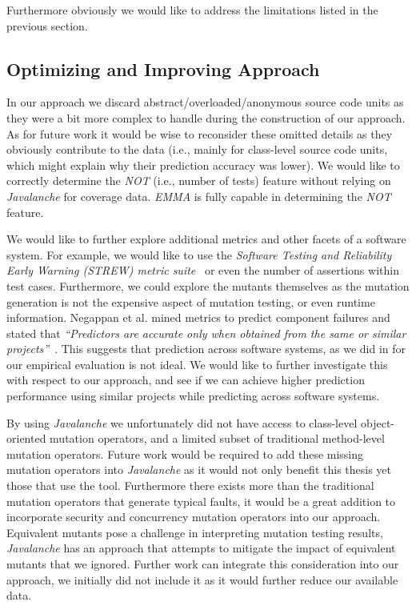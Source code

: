 Furthermore obviously we would like to address the limitations listed in the previous section.


\subsection{Optimizing and Improving Approach}
\label{subsec:conclusions_optimizing_approach}
In our approach we discard abstract/overloaded/anonymous source code units as they were a bit more complex to handle during the construction of our approach. As for future work it would be wise to reconsider these omitted details as they obviously contribute to the data (i.e., mainly for class-level source code units, which might explain why their prediction accuracy was lower). We would like to correctly determine the \emph{NOT} (i.e., number of tests) feature without relying on \emph{Javalanche} for coverage data. \emph{EMMA} is fully capable in determining the \emph{NOT} feature.

We would like to further explore additional metrics and other facets of a software system. For example, we would like to use the \emph{Software Testing and Reliability Early Warning (STREW) metric suite}~\cite{NWO+05, NWVO05} or even the number of assertions within test cases. Furthermore, we could explore the mutants themselves as the mutation generation is not the expensive aspect of mutation testing, or even runtime information. Negappan et al. mined metrics to predict component failures and stated that \emph{``Predictors are accurate only when obtained from the same or similar projects''}~\cite{NBZ06}. This suggests that prediction across software systems, as we did in for our empirical evaluation is not ideal. We would like to further investigate this with respect to our approach, and see if we can achieve higher prediction performance using similar projects while predicting across software systems.

By using \emph{Javalanche} we unfortunately did not have access to class-level object-oriented mutation operators, and a limited subset of traditional method-level mutation operators. Future work would be required to add these missing mutation operators into \emph{Javalanche} as it would not only benefit this thesis yet those that use the tool. Furthermore there exists more than the traditional mutation operators that generate typical faults, it would be a great addition to incorporate security and concurrency mutation operators into our approach. Equivalent mutants pose a challenge in interpreting mutation testing results, \emph{Javalanche} has an approach that attempts to mitigate the impact of equivalent mutants that we ignored. Further work can integrate this consideration into our approach, we initially did not include it as it would further reduce our available data.

